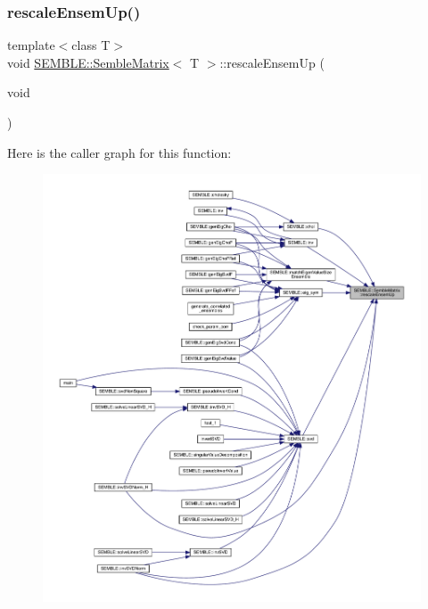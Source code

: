 \subsubsection{\texorpdfstring{rescaleEnsemUp()}{rescaleEnsemUp()}\hspace{0.1cm}{\footnotesize\ttfamily [1/2]}}
{\footnotesize\ttfamily template$<$class T$>$ \\
void \mbox{\hyperlink{structSEMBLE_1_1SembleMatrix}{S\+E\+M\+B\+L\+E\+::\+Semble\+Matrix}}$<$ T $>$\+::rescale\+Ensem\+Up (\begin{DoxyParamCaption}\item[{void}]{ }\end{DoxyParamCaption})\hspace{0.3cm}{\ttfamily [inline]}}

Here is the caller graph for this function\+:
\nopagebreak
\begin{figure}[H]
\begin{center}
\leavevmode
\includegraphics[width=350pt]{df/d87/structSEMBLE_1_1SembleMatrix_a6c6da8677941f6422d30c582f6fd87c0_icgraph}
\end{center}
\end{figure}
\mbox{\label{structSEMBLE_1_1SembleMatrix_a6c6da8677941f6422d30c582f6fd87c0}} 
